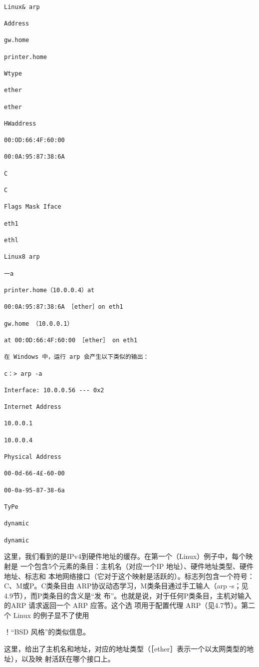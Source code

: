 \begin{verbatim}
    
Linux& arp

Address

gw.home

printer.home

Wtype

ether

ether

HWaddress

00:OD:66:4F:60:00

00:0A:95:87:38:6A

C

C

Flags Mask Iface

eth1

ethl

Linux8 arp

一a

printer.home（10.0.0.4）at

00:0A:95:87:38:6A ［ether］on eth1

gw.home （10.0.0.1）

at 00:0D:66:4F:60:00 ［ether］ on eth1

在 Windows 中，运行 arp 会产生以下类似的输出：

c：> arp -a

Interface: 10.0.0.56 --- 0x2

Internet Address

10.0.0.1

10.0.0.4

Physical Address

00-0d-66-4£-60-00

00-0a-95-87-38-6a

TyPe

dynamic

dynamic
\end{verbatim}

这里，我们看到的是IPv4到硬件地址的缓存。在第一个（Linux）例子中，每个映射是
一个包含5个元素的条目：主机名（对应一个IP 地址）、硬件地址类型、硬件地址、标志和
本地网络接口（它对于这个映射是活跃的）。标志列包含一个符号：C、M或P。C类条目由
ARP协议动态学习，M类条目通过手工输人（arp -s；见4.9节），而P类条目的含义是“发
布”。也就是说，对于任何P类条目，主机对输入的ARP 请求返回一个 ARP 应答。这个选
项用于配置代理 ARP（见4.7节）。第二个 Linux 的例子显不了使用

！“BSD 风格”的类似信息。

这里，给出了主机名和地址，对应的地址类型（［ether］表示一个以太网类型的地址），以及映
射活跃在哪个接口上。


